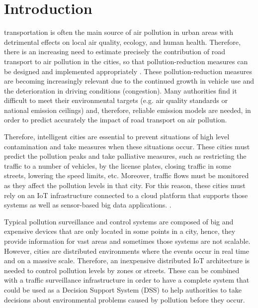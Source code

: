 
\chapter{Introduction} %
 transportation is often the main source of air pollution in urban areas with detrimental effects on local air quality, ecology, and human health. Therefore, there is an increasing need to estimate precisely the contribution of road transport to air pollution in the cities, so that pollution-reduction measures can be designed and implemented appropriately \cite{SNB10}. These pollution-reduction measures are becoming increasingly relevant due to the continued growth in vehicle use and the deterioration in driving conditions (congestion). Many authorities find it difficult to meet their environmental targets (e.g. air quality standards or national emission ceilings) and, therefore, reliable emission models are needed, in order to predict accurately the impact of road transport on air pollution.

Therefore, intelligent cities are essential to prevent situations of high level contamination and take measures when these situations occur. These cities must predict the pollution peaks and take palliative measures, such as restricting the traffic to a number of vehicles, by the license plates, closing traffic in some streets, lowering the speed limits, etc. Moreover, traffic flows must be monitored as they affect the pollution levels in that city. For this reason, these cities must rely on an \ac{IoT} infrastructure connected to a cloud platform that supports those systems as well as sensor-based big data applications. \cite{Bib18}.

Typical pollution surveillance and control systems are composed of big and expensive devices that are only located in some points in a city, hence, they provide information for vast areas and sometimes those systems are not scalable. However, cities are distributed environments where the events occur in real time and on a massive scale. Therefore, an inexpensive distributed IoT architecture is needed to control pollution levels by zones or streets. These can be combined with a traffic surveillance infrastructure in order to have a complete system that could be used as a Decision Support System (DSS) to help authorities to take decisions about environmental problems caused by pollution before they occur.

